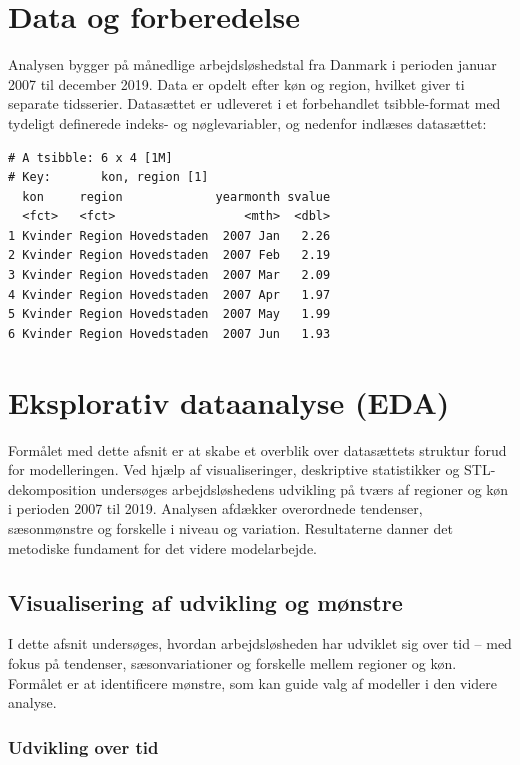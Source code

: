 \documentclass[
]{article}
\begin{document}
\section{Data og forberedelse}\label{data-og-forberedelse}

Analysen bygger på månedlige arbejdsløshedstal fra Danmark i perioden
januar 2007 til december 2019. Data er opdelt efter køn og region,
hvilket giver ti separate tidsserier. Datasættet er udleveret i et
forbehandlet tsibble-format med tydeligt definerede indeks- og
nøglevariabler, og nedenfor indlæses datasættet:

\begin{verbatim}
# A tsibble: 6 x 4 [1M]
# Key:       kon, region [1]
  kon     region             yearmonth svalue
  <fct>   <fct>                  <mth>  <dbl>
1 Kvinder Region Hovedstaden  2007 Jan   2.26
2 Kvinder Region Hovedstaden  2007 Feb   2.19
3 Kvinder Region Hovedstaden  2007 Mar   2.09
4 Kvinder Region Hovedstaden  2007 Apr   1.97
5 Kvinder Region Hovedstaden  2007 May   1.99
6 Kvinder Region Hovedstaden  2007 Jun   1.93
\end{verbatim}

\section{Eksplorativ dataanalyse
(EDA)}\label{eksplorativ-dataanalyse-eda}

Formålet med dette afsnit er at skabe et overblik over datasættets
struktur forud for modelleringen. Ved hjælp af visualiseringer,
deskriptive statistikker og STL-dekomposition undersøges
arbejdsløshedens udvikling på tværs af regioner og køn i perioden 2007
til 2019. Analysen afdækker overordnede tendenser, sæsonmønstre og
forskelle i niveau og variation. Resultaterne danner det metodiske
fundament for det videre modelarbejde.

\subsection{Visualisering af udvikling og
mønstre}\label{visualisering-af-udvikling-og-muxf8nstre}

I dette afsnit undersøges, hvordan arbejdsløsheden har udviklet sig over
tid -- med fokus på tendenser, sæsonvariationer og forskelle mellem
regioner og køn. Formålet er at identificere mønstre, som kan guide valg
af modeller i den videre analyse.

\subsubsection{Udvikling over tid}\label{udvikling-over-tid}
\end{document}

